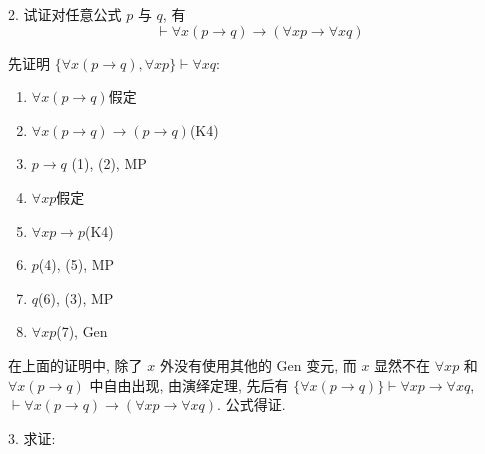 \documentclass[boxes]{homework}
\begin{document}
\begin{problem}
    2. 试证对任意公式 $p$ 与 $q$, 有
    $$
        \vdash \forall x(p\to q)\to (\forall xp\to \forall xq)
    $$
\end{problem}
\begin{solution}
    先证明 $\{\forall x(p\to q), \forall x p\}\vdash \forall xq$:
    \begin{enumerate}[label = (\arabic*), parsep = 0pt, itemsep = 0pt, topsep = .25em]
        \item $\forall x(p\to q)$\hfill 假定
        \item $\forall x(p\to q)\to (p\to q)$\hfill (K4)
        \item $p\to q$ \hfill (1), (2), MP
        \item $\forall x p$\hfill 假定
        \item $\forall x p\to p$\hfill (K4)
        \item $p$\hfill (4), (5), MP
        \item $q$\hfill (6), (3), MP
        \item $\forall xp$\hfill (7), Gen
    \end{enumerate}
    在上面的证明中, 除了 $x$ 外没有使用其他的 Gen 变元, 而 $x$ 显然不在 $\forall x p$ 和 $\forall x(p\to q)$ 中自由出现, 由演绎定理, 先后有 $\{\forall x(p\to q)\}\vdash \forall xp\to \forall xq$, $\vdash \forall x(p\to q)\to (\forall xp\to \forall xq)$. 公式得证.
\end{solution}
\begin{problem}
    3. 求证:
\end{problem}
\end{document}
